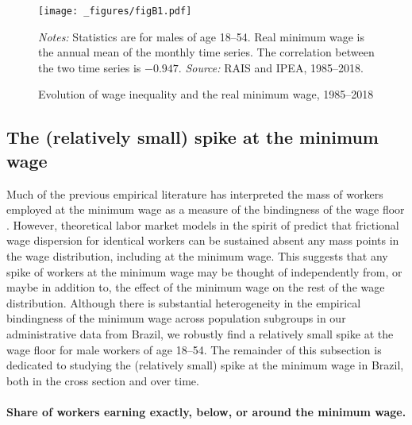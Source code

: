 \begin{figure}[!htb]
  \centering
  \caption{\label{fig:var_minw}Evolution of wage inequality and the real minimum wage, 1985--2018}
  \prefigvspace
  \texttt{[image: \_figures/figB1.pdf]} %
  \\
  \postfigvspace
  \begin{minipage}[t]{1\columnwidth}%
    \begin{spacing}{0.75}
      \emph{\scriptsize{}Notes: }{\scriptsize{}Statistics are for males
      of age 18--54. Real minimum wage is the annual mean of the monthly
      time series. The correlation between the two time series is $-0.947$. %
      \emph{\scriptsize{}Source: } RAIS and IPEA, 1985--2018.}
    \end{spacing}
  \end{minipage}
\end{figure}




\clearpage
\subsection{The (relatively small) spike at the minimum wage \label{app:mw_spike}}

Much of the previous empirical literature has interpreted the mass of workers employed at the minimum wage as a measure of the bindingness of the wage floor . However, theoretical labor market models in the spirit of  predict that frictional wage dispersion for identical workers can be sustained absent any mass points in the wage distribution, including at the minimum wage. This suggests that any spike of workers at the minimum wage may be thought of independently from, or maybe in addition to, the effect of the minimum wage on the rest of the wage distribution. Although there is substantial heterogeneity in the empirical bindingness of the minimum wage across population subgroups in our administrative data from Brazil, we robustly find a relatively small spike at the wage floor for male workers of age 18--54. The remainder of this subsection is dedicated to studying the (relatively small) spike at the minimum wage in Brazil, both in the cross section and over time.


\paragraph{Share of workers earning exactly, below, or around the minimum wage.}

